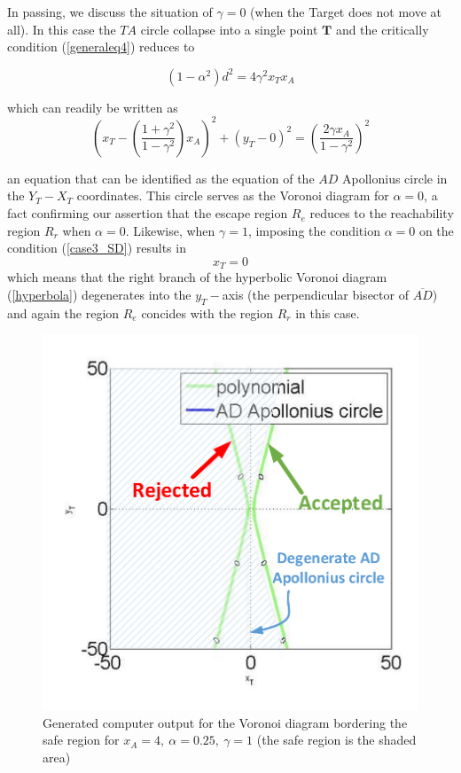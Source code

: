 \documentclass[final,5p,times,twocolumn]{elsarticle}
\begin{document}
In passing, we discuss the situation of $\gamma=0$ (when the Target does not move at all). In this case the $TA$ circle collapse into a single point $\boldsymbol{T}$ and the critically condition (\ref{generaleq4}) reduces to 

\begin{equation}
(1-\alpha^{2})d^{2}= 4 \gamma^{2} x_{T} x_{A}
\end{equation}

which can readily be written as 
\begin{equation}
(x_T-(\dfrac{1+\gamma^2}{1-\gamma^2})x_A)^2+(y_T-0)^2
=(\dfrac{2\gamma x_{A}}{1-\gamma^{2}})^{2}
\end{equation}

an equation that can be identified as the equation of the $AD$ Apollonius circle in the $Y_T-X_T$ coordinates.
This circle serves as the Voronoi diagram for $\alpha=0$, a fact confirming our assertion that the escape region $R_e$ reduces to the reachability region $R_r$ when $\alpha=0$. Likewise, when $\gamma=1$, imposing the condition $\alpha=0$ on the condition (\ref{case3_SD}) results in 
\begin{equation}
x_T=0
\end{equation} 
which means that the right branch of the hyperbolic Voronoi diagram (\ref{hyperbola}) degenerates into the $y_T-$axis (the perpendicular bisector of $\overline{AD}$) and again the region $R_e$ concides with the region $R_r$ in this case.


\begin{figure}[htb]
\centering
\includegraphics[width=0.75\columnwidth]{g_1.pdf}
\caption{Generated computer output for the Voronoi diagram bordering the safe region for $x_A=4,\ \alpha=0.25,\ \gamma=1$ (the safe region is the shaded area)}
\label{gamma=1}
\end{figure}
\end{document}
